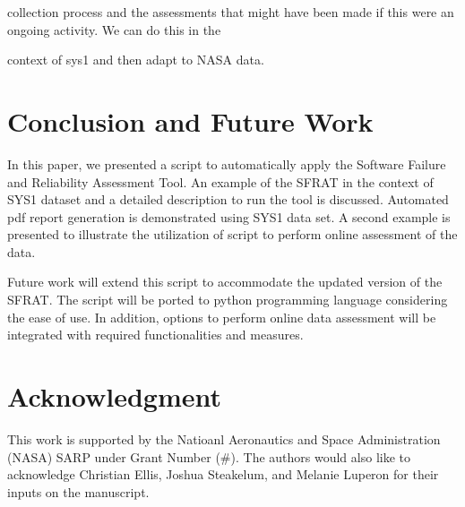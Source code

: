 \documentclass[conference]{IEEEtran}
\begin{document}
collection process and the assessments that might have been made if this were an ongoing activity. We can do this in the

context of sys1 and then adapt to NASA data.


\section{Conclusion and Future Work}\label{sec:Concl}
In this paper, we presented a script to automatically apply the Software Failure and Reliability Assessment Tool. An example of the SFRAT in the context of SYS1 dataset and a detailed description to run the tool is discussed. Automated pdf report generation is demonstrated using SYS1 data set. A second example is presented to illustrate the utilization of script to perform online assessment of the data. 

Future work will extend this script to accommodate the updated version of the SFRAT. The script will be ported to python programming language considering the ease of use. In addition, options to perform online data assessment will be integrated with required functionalities and measures.


\section*{Acknowledgment}\label{sec:Ack}
This work is supported by the Natioanl Aeronautics and Space Administration (NASA) SARP under Grant Number (\#). The authors would also like to acknowledge Christian Ellis, Joshua Steakelum, and Melanie Luperon for their inputs on the manuscript.




\end{document}
